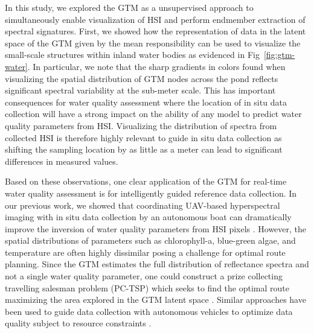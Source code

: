 \documentclass[remotesensing,article,submit,pdftex,moreauthors]{Definitions/mdpi}
\begin{document}
In this study, we explored the GTM as a unsupervised approach to simultaneously enable visualization of HSI and perform endmember extraction of spectral signatures. First, we showed how the representation of data in the latent space of the GTM given by the mean responsibility can be used to visualize the small-scale structures within inland water bodies as evidenced in Fig~\ref{fig:gtm-water}. In particular, we note that the sharp gradients in colors found when visualizing the spatial distribution of GTM nodes across the pond reflects significant spectral variability at the sub-meter scale. This has important consequences for water quality assessment where the location of in situ data collection will have a strong impact on the ability of any model to predict water quality parameters from HSI. Visualizing the distribution of spectra from collected HSI is therefore highly relevant to guide in situ data collection as shifting the sampling location by as little as a meter can lead to significant differences in measured values. 

Based on these observations, one clear application of the GTM for real-time water quality assessment is for intelligently guided reference data collection. In our previous work, we showed that coordinating UAV-based hyperspectral imaging with in situ data collection by an autonomous boat can dramatically improve the inversion of water quality parameters from HSI pixels \cite{robot-team-2}. However, the spatial distributions of parameters such as chlorophyll-a, blue-green algae, and temperature are often highly dissimilar posing a challenge for optimal route planning. Since the GTM estimates the full distribution of reflectance spectra and not a single water quality parameter, one could construct a prize collecting travelling salesman problem (PC-TSP) which seeks to find the optimal route maximizing the area explored in the GTM latent space \cite{balas2007prize}. Similar approaches have been used to guide data collection with autonomous vehicles to optimize data quality subject to resource constraints \cite{suryan2020learning}.
\end{document}
